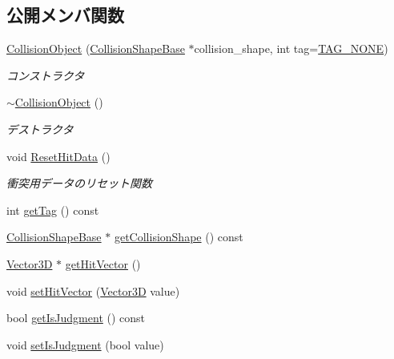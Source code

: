 \subsection*{公開メンバ関数}
\begin{DoxyCompactItemize}
\item 
\mbox{\hyperlink{class_collision_object_a6f502c16aaae1dc1470107a930f28808}{Collision\+Object}} (\mbox{\hyperlink{class_collision_shape_base}{Collision\+Shape\+Base}} $\ast$collision\+\_\+shape, int tag=\mbox{\hyperlink{class_collision_object_a22badef1e6fc9c2b1f002bd99ede049f}{T\+A\+G\+\_\+\+N\+O\+NE}})
\begin{DoxyCompactList}\small\item\em コンストラクタ \end{DoxyCompactList}\item 
\mbox{\hyperlink{class_collision_object_a8c4e6916bc5911b8a82498536d5a27e1}{$\sim$\+Collision\+Object}} ()
\begin{DoxyCompactList}\small\item\em デストラクタ \end{DoxyCompactList}\item 
void \mbox{\hyperlink{class_collision_object_a92dd5d21c6674605d290e0d37d64505a}{Reset\+Hit\+Data}} ()
\begin{DoxyCompactList}\small\item\em 衝突用データのリセット関数 \end{DoxyCompactList}\item 
int \mbox{\hyperlink{class_collision_object_a1198d5941d2ba8a9b394c0e43e4b9fd9}{get\+Tag}} () const
\item 
\mbox{\hyperlink{class_collision_shape_base}{Collision\+Shape\+Base}} $\ast$ \mbox{\hyperlink{class_collision_object_a3ff1c2d794f520c96b6bc6037a8f8f8c}{get\+Collision\+Shape}} () const
\item 
\mbox{\hyperlink{class_vector3_d}{Vector3D}} $\ast$ \mbox{\hyperlink{class_collision_object_adb01187ec10302f13034407a3c852860}{get\+Hit\+Vector}} ()
\item 
void \mbox{\hyperlink{class_collision_object_a1087fa9cebfe0b1675923807b73d8868}{set\+Hit\+Vector}} (\mbox{\hyperlink{class_vector3_d}{Vector3D}} value)
\item 
bool \mbox{\hyperlink{class_collision_object_ac11b01882a159efadbe62bd5a66c49aa}{get\+Is\+Judgment}} () const
\item 
void \mbox{\hyperlink{class_collision_object_a3000144caea71e39cbdafebb249fef7e}{set\+Is\+Judgment}} (bool value)
\end{DoxyCompactItemize}
